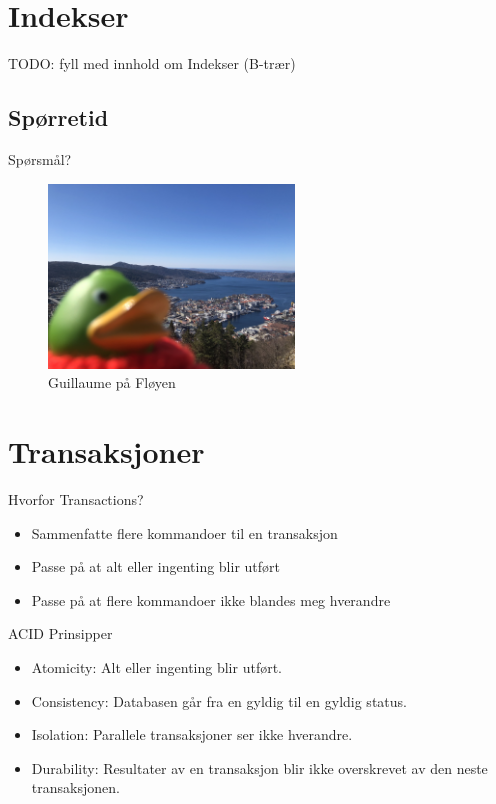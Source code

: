 
\section{Indekser}
\begin{frame}{}
    TODO: fyll med innhold om Indekser (B-trær)
\end{frame}

\subsection*{Spørretid}
\begin{frame}{Spørsmål?}
    \begin{figure}
        \centering
        \includegraphics[height = 4.9cm]{images/guillaume10.jpg}
        \caption{Guillaume på Fløyen}
        \label{fig:guillaume10}
    \end{figure}
\end{frame}


\section{Transaksjoner}
\begin{frame}{Hvorfor Transactions?}
    \begin{itemize}
        \item Sammenfatte flere kommandoer til en transaksjon
        \item Passe på at alt eller ingenting blir utført
        \item Passe på at flere kommandoer ikke blandes meg hverandre
    \end{itemize}
\end{frame}

\begin{frame}{ACID Prinsipper}
    \begin{itemize}
        \item Atomicity: Alt eller ingenting blir utført.
        \item Consistency: Databasen går fra en gyldig til en gyldig status.
        \item Isolation: Parallele transaksjoner ser ikke hverandre.
        \item Durability: Resultater av en transaksjon blir ikke overskrevet av den neste transaksjonen.
    \end{itemize}
\end{frame}

